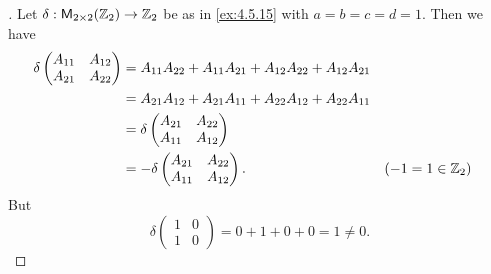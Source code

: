 \begin{proof}[]
  Let \(\delta : \ms[2][2][\Z_2] \to \Z_2\) be as in \cref{ex:4.5.15} with \(a = b = c = d = 1\).
  Then we have
  \begin{align*}
    \delta\begin{pmatrix}
            A_{1 1} & A_{1 2} \\
            A_{2 1} & A_{2 2}
          \end{pmatrix} & = A_{1 1} A_{2 2} + A_{1 1} A_{2 1} + A_{1 2} A_{2 2} + A_{1 2} A_{2 1}                         \\
                          & = A_{2 1} A_{1 2} + A_{2 1} A_{1 1} + A_{2 2} A_{1 2} + A_{2 2} A_{1 1}                       \\
                          & = \delta\begin{pmatrix}
                                      A_{2 1} & A_{2 2} \\
                                      A_{1 1} & A_{1 2}
                                    \end{pmatrix}                                                                     \\
                          & = -\delta\begin{pmatrix}
                                       A_{2 1} & A_{2 2} \\
                                       A_{1 1} & A_{1 2}
                                     \end{pmatrix}.                                                &  & (-1 = 1 \in \mathbb{Z}_2)
  \end{align*}
  But
  \[
    \delta\begin{pmatrix}
      1 & 0 \\
      1 & 0
    \end{pmatrix} = 0 + 1 + 0 + 0 = 1 \neq 0.
  \]
\end{proof}
